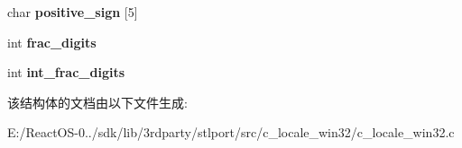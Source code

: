 \begin{DoxyCompactItemize}
\item 
\mbox{\label{struct___locale__monetary_af70b4abd5fcba688a05e89b276aa4dee}} 
char {\bfseries positive\+\_\+sign} \mbox{[}5\mbox{]}
\item 
\mbox{\label{struct___locale__monetary_a77d1be839f4fc16e3625ace5788278fd}} 
int {\bfseries frac\+\_\+digits}
\item 
\mbox{\label{struct___locale__monetary_afd94f72ca86cd1d23669c08e322e3040}} 
int {\bfseries int\+\_\+frac\+\_\+digits}
\end{DoxyCompactItemize}


该结构体的文档由以下文件生成\+:\begin{DoxyCompactItemize}
\item 
E\+:/\+React\+O\+S-\/0../sdk/lib/3rdparty/stlport/src/c\+\_\+locale\+\_\+win32/c\+\_\+locale\+\_\+win32.\+c\end{DoxyCompactItemize}
